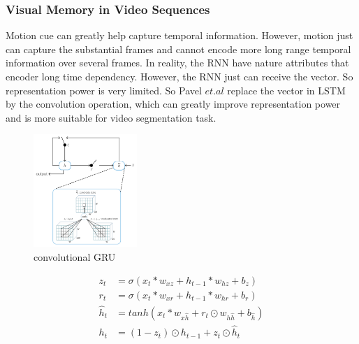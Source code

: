 \subsubsection{Visual Memory in Video Sequences}
Motion cue can greatly help capture temporal information. However, motion just can capture the substantial frames and cannot encode more long range
temporal information over several frames. In reality, the RNN have nature attributes that encoder long time dependency. However, the RNN just can 
receive the vector. So representation power is very limited. So Pavel $et.al$\cite{Tokmakov2017Learning} replace the vector in LSTM by the convolution 
operation, which can greatly improve representation power and is more suitable for video segmentation task.
\begin{figure}[ht]
    \centering
    \includegraphics[width=0.35\textwidth]{figure/LVO_CONVRRU.png}
    \caption{convolutional GRU}
    \label{CONVGRU}
\end{figure}

\begin{align}
　　　　　z_t &= \sigma(x_t*w_{xz} + h_{t-1}*w_{hz}+b_z)　\\
　　　　　r_t &= \sigma(x_t*w_{xr} + h_{t-1}*w_{hr}+b_r) \\
　　　　　\hat{h}_t &= tanh(x_t*w_{x\hat{h}} + r_t \odot w_{h\hat{h}}+b_{\hat{h}}) \\
　　　　　h_t &= (1-z_t) \odot h_{t-1} + z_t \odot \hat{h}_t
\end{align}

